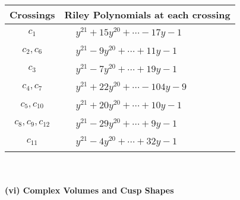 \documentclass[1p]{elsarticle_modified}
\theoremstyle{definition}
\begin{document}
\begin{tabular}{m{50pt}|m{274pt}}
Crossings & \hspace{64pt}Riley Polynomials at each crossing \\
\hline $$\begin{aligned}c_{1}\end{aligned}$$&$\begin{aligned}
&y^{21}+15 y^{20}+\cdots-17 y-1
\end{aligned}$\\
\hline $$\begin{aligned}c_{2},c_{6}\end{aligned}$$&$\begin{aligned}
&y^{21}-9 y^{20}+\cdots+11 y-1
\end{aligned}$\\
\hline $$\begin{aligned}c_{3}\end{aligned}$$&$\begin{aligned}
&y^{21}-7 y^{20}+\cdots+19 y-1
\end{aligned}$\\
\hline $$\begin{aligned}c_{4},c_{7}\end{aligned}$$&$\begin{aligned}
&y^{21}+22 y^{20}+\cdots-104 y-9
\end{aligned}$\\
\hline $$\begin{aligned}c_{5},c_{10}\end{aligned}$$&$\begin{aligned}
&y^{21}+20 y^{20}+\cdots+10 y-1
\end{aligned}$\\
\hline $$\begin{aligned}c_{8},c_{9},c_{12}\end{aligned}$$&$\begin{aligned}
&y^{21}-29 y^{20}+\cdots+9 y-1
\end{aligned}$\\
\hline $$\begin{aligned}c_{11}\end{aligned}$$&$\begin{aligned}
&y^{21}-4 y^{20}+\cdots+32 y-1
\end{aligned}$\\
\hline
\end{tabular}\\~\\
\newpage\flushleft \textbf{(vi) Complex Volumes and Cusp Shapes}
\end{document}
